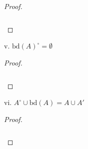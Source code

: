 \begin{proof}\renewcommand{\qedsymbol}{}\ \\\\
    \begin{align*}
    \end{align*}
\end{proof}

\pagebreak

v. $\text{bd}(A)^{\circ} = \emptyset$ \ \\
    
\begin{proof}\renewcommand{\qedsymbol}{}\ \\\\
    \begin{align*}
    \end{align*}
\end{proof}

\pagebreak

vi. $A^{\circ} \cup \text{bd}(A) = A \cup A'$ \ \\
    
\begin{proof}\renewcommand{\qedsymbol}{}\ \\\\
    \begin{align*}
    \end{align*}
\end{proof}

\pagebreak